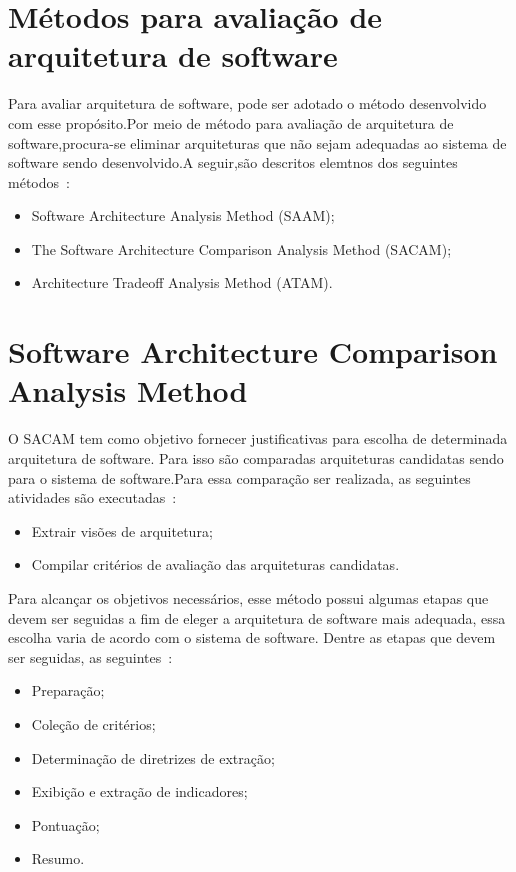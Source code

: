 \section{Métodos para avaliação de arquitetura de software}

Para avaliar arquitetura de software, pode ser adotado o método desenvolvido com esse propósito.Por meio de método para avaliação de arquitetura de software,procura-se eliminar arquiteturas que não sejam adequadas ao sistema de software sendo desenvolvido.A seguir,são descritos elemtnos dos seguintes métodos~\cite{survey_methods}: 

\begin{itemize}
    \item Software Architecture Analysis Method (SAAM);
    \item The Software Architecture Comparison Analysis Method (SACAM);
    \item Architecture Tradeoff Analysis Method (ATAM).
  \end{itemize}

\section{Software Architecture Comparison Analysis Method}

O \acrfull{SACAM} tem como objetivo fornecer justificativas para escolha de determinada arquitetura de software. 
Para isso são comparadas arquiteturas candidatas sendo para o sistema de software.Para essa comparação ser realizada, as seguintes atividades são executadas~\cite{SACAM}:

\begin{itemize}
    \item Extrair visões de arquitetura;
    \item Compilar critérios de avaliação das arquiteturas candidatas.
\end{itemize}

Para alcançar os objetivos necessários, esse  método possui algumas etapas que devem ser seguidas a fim de eleger a  arquitetura de software mais adequada, essa escolha varia de acordo com o sistema de software. Dentre as etapas que devem ser seguidas, as seguintes~\cite{SACAM}:

\begin{itemize}
    \item Preparação;
    \item Coleção de critérios;
    \item Determinação de diretrizes de extração;
    \item Exibição e extração de indicadores;
    \item Pontuação;
    \item Resumo.
\end{itemize}

